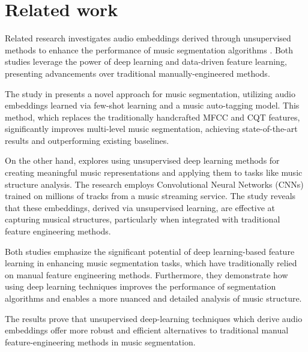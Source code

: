 \section{Related work}

Related research investigates audio embeddings derived through unsupervised methods to enhance the performance of music segmentation algorithms \cite{deepfeaturesegment, SalamonDeepSegmentation}. Both studies leverage the power of deep learning and data-driven feature learning, presenting advancements over traditional manually-engineered methods.

The study in \cite{deepfeaturesegment} presents a novel approach for music segmentation, utilizing audio embeddings learned via few-shot learning and a music auto-tagging model. This method, which replaces the traditionally handcrafted MFCC and CQT features, significantly improves multi-level music segmentation, achieving state-of-the-art results and outperforming existing baselines.

On the other hand, \cite{SalamonDeepSegmentation} explores using unsupervised deep learning methods for creating meaningful music representations and applying them to tasks like music structure analysis. The research employs Convolutional Neural Networks (CNNs) trained on millions of tracks from a music streaming service. The study reveals that these embeddings, derived via unsupervised learning, are effective at capturing musical structures, particularly when integrated with traditional feature engineering methods.

Both studies emphasize the significant potential of deep learning-based feature learning in enhancing music segmentation tasks, which have traditionally relied on manual feature engineering methods. Furthermore, they demonstrate how using deep learning techniques improves the performance of segmentation algorithms and enables a more nuanced and detailed analysis of music structure. 

The results prove that unsupervised deep-learning techniques which derive audio embeddings offer more robust and efficient alternatives to traditional manual feature-engineering methods in music segmentation.

